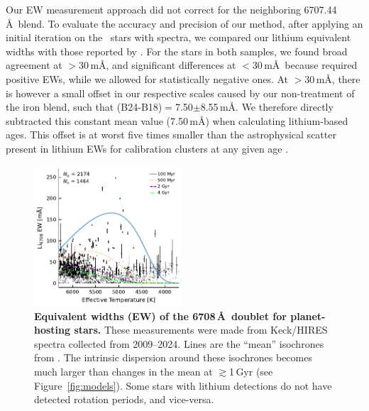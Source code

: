 \documentclass[11pt,twocolumn,tighten,linenumbers,trackchanges]{aastex63}
\begin{document}
Our EW measurement approach did not correct for the neighboring
 6707.44\,\AA\ blend.  To evaluate the accuracy and
precision of our method, after applying an initial iteration on the
\nlithiumstars\ stars with spectra, we compared our lithium equivalent
widths with those reported by \citet{2018ApJ...855..115B}.  For the
stars in both samples, we found broad agreement at $>$30\,m\AA, and
significant differences at $<$30\,m\AA\ because
\citet{2018ApJ...855..115B} required positive EWs, while we allowed
for statistically negative ones.  At $>$30\,m\AA, there is however a
small offset in our respective scales caused by our non-treatment of
the iron blend, such that (B24-B18)$=$7.50$\pm$8.55\,m\AA.  We
therefore directly subtracted this constant mean value (7.50\,m\AA)
when calculating lithium-based ages.  This offset is at worst five
times smaller than the astrophysical scatter present in lithium EWs
for calibration clusters at any given age
\citep[see][]{Jeffries_2023}.


\begin{figure}[!t]
	\begin{center}
		\leavevmode
		\includegraphics[width=0.49\textwidth]{li_vs_teff_koi_X_JUMP_eagles.pdf}
	\end{center}
	\vspace{-0.25cm}
	\caption{{\bf Equivalent widths (EW) of the  6708\,\AA\ doublet
    for planet-hosting stars.} These measurements were made from
    Keck/HIRES spectra collected from 2009--2024.  Lines are the ``mean''
    isochrones from \citet{Jeffries_2023}.  The intrinsic dispersion
    around these isochrones becomes much larger than changes in the
    mean at $\gtrsim$1\,Gyr (see Figure~\ref{fig:models}).  Some stars
    with lithium detections do not have detected rotation periods, and
    vice-versa.
		\label{fig:li_vs_teff}
	}
\end{figure}
\end{document}
